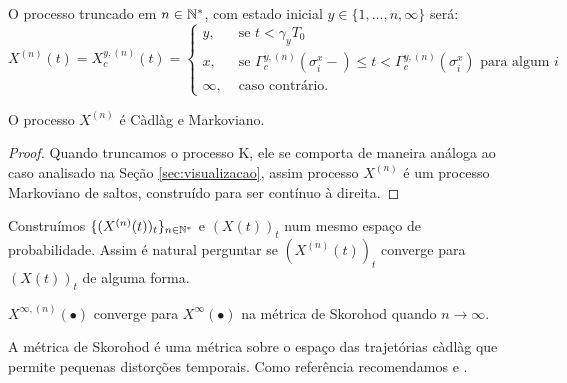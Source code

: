 O processo truncado em $n \in {\mathbb{N^*}}$, com estado inicial $y \in \{1,
\ldots, n, \infty\}$ será:
\begin{displaymath}
  X^{(n)}(t) = X^{y,(n)}_c(t) = \begin{cases}
    y, & \textrm{ se }  t < \gamma_y T_0 \\
    x, & \textrm{ se } \Gamma^{y,(n)}_c(\sigma_i^x-) \leq t <
    \Gamma^{y,(n)}_c(\sigma^x_i)
    \text{ para algum } i \\
    \infty, & \textrm{ caso contrário.}
  \end{cases}
\end{displaymath}

\begin{proposicao}
  O processo $X^{(n)}$ é Càdlàg e Markoviano.
\end{proposicao}
\begin{proof}
  Quando truncamos o processo K, ele se comporta de maneira análoga ao
  caso analisado na Seção \ref{sec:visualizacao}, assim processo
  $X^{(n)}$ é um processo Markoviano de saltos, construído para ser
  contínuo à direita.
\end{proof}

Construímos $\{(X^{(n)}(t))_t\}_{n \in {\mathbb{N^*}}}$ e $(X(t))_t$ num mesmo
espaço de probabilidade. Assim é natural perguntar se $(X^{(n)}(t))_t$
converge para $(X(t))_t$ de alguma forma.

\begin{teorema}
  \label{teo:convergencia}
  $X^{\infty, (n)} (\bullet)$ converge para $X^\infty(\bullet)$ \qc na
  métrica de Skorohod quando $n \to \infty$.
\end{teorema}

A métrica de Skorohod é uma métrica sobre o espaço das trajetórias
càdlàg que permite pequenas distorções temporais. Como
referência recomendamos \cite{billingsley:99} e \cite{ethier:86}.

